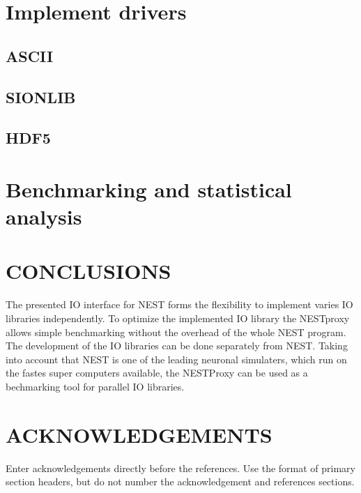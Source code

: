 \documentclass[]{YIC2015}
\begin{document}
\section{Implement drivers}
\subsection{ASCII}
\subsection{SIONLIB}
\subsection{HDF5}
\section{Benchmarking and statistical analysis}


\section{CONCLUSIONS}
The presented IO interface for NEST forms the flexibility to implement varies IO libraries independently.
To optimize the implemented IO library the NESTproxy allows simple benchmarking without the overhead of the whole NEST program.
The development of the IO libraries can be done separately from NEST.
Taking into account that NEST is one of the leading neuronal simulaters, which run on the fastes super computers available,
the NESTProxy can be used as a bechmarking tool for parallel IO libraries.

\section*{ACKNOWLEDGEMENTS}
Enter acknowledgements directly before the references. Use the format of primary section headers, but do not number the acknowledgement and references sections.
\end{document}
